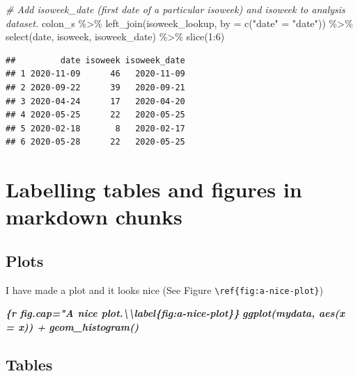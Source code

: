 \documentclass[
]{book}
\newenvironment{Shaded}{\begin{snugshade}}{\end{snugshade}}
\newcommand{\AttributeTok}[1]{\textcolor[rgb]{0.77,0.63,0.00}{#1}}
\newcommand{\CommentTok}[1]{\textcolor[rgb]{0.56,0.35,0.01}{\textit{#1}}}
\newcommand{\DecValTok}[1]{\textcolor[rgb]{0.00,0.00,0.81}{#1}}
\newcommand{\FunctionTok}[1]{\textcolor[rgb]{0.00,0.00,0.00}{#1}}
\newcommand{\InformationTok}[1]{\textcolor[rgb]{0.56,0.35,0.01}{\textbf{\textit{#1}}}}
\newcommand{\NormalTok}[1]{#1}
\newcommand{\OtherTok}[1]{\textcolor[rgb]{0.56,0.35,0.01}{#1}}
\newcommand{\SpecialCharTok}[1]{\textcolor[rgb]{0.00,0.00,0.00}{#1}}
\newcommand{\StringTok}[1]{\textcolor[rgb]{0.31,0.60,0.02}{#1}}
\begin{document}
\begin{Shaded}
\begin{Highlighting}[]
\CommentTok{\# Add isoweek\_date (first date of a particular isoweek) and isoweek to analysis dataset. }
\NormalTok{colon\_s }\SpecialCharTok{\%\textgreater{}\%} 
  \FunctionTok{left\_join}\NormalTok{(isoweek\_lookup, }\AttributeTok{by =} \FunctionTok{c}\NormalTok{(}\StringTok{"date"} \OtherTok{=} \StringTok{"date"}\NormalTok{)) }\SpecialCharTok{\%\textgreater{}\%} 
  \FunctionTok{select}\NormalTok{(date, isoweek, isoweek\_date) }\SpecialCharTok{\%\textgreater{}\%} 
  \FunctionTok{slice}\NormalTok{(}\DecValTok{1}\SpecialCharTok{:}\DecValTok{6}\NormalTok{)}
\end{Highlighting}
\end{Shaded}

\begin{verbatim}
##         date isoweek isoweek_date
## 1 2020-11-09      46   2020-11-09
## 2 2020-09-22      39   2020-09-21
## 3 2020-04-24      17   2020-04-20
## 4 2020-05-25      22   2020-05-25
## 5 2020-02-18       8   2020-02-17
## 6 2020-05-28      22   2020-05-25
\end{verbatim}

\hypertarget{labelling-tables-and-figures-in-markdown-chunks}{%
\section{Labelling tables and figures in markdown chunks}\label{labelling-tables-and-figures-in-markdown-chunks}}

\hypertarget{plots}{%
\subsection{Plots}\label{plots}}

I have made a plot and it looks nice (See Figure \texttt{\textbackslash{}ref\{fig:a-nice-plot\}})

\begin{Shaded}
\begin{Highlighting}[]
\InformationTok{\textasciigrave{}\textasciigrave{}\textasciigrave{}\{r fig.cap="A nice plot.\textbackslash{}\textbackslash{}label\{fig:a{-}nice{-}plot\}\}}
\InformationTok{ggplot(mydata, aes(x = x)) +}
\InformationTok{  geom\_histogram()}
\InformationTok{\textasciigrave{}\textasciigrave{}\textasciigrave{}}
\end{Highlighting}
\end{Shaded}

\hypertarget{tables}{%
\subsection{Tables}\label{tables}}
\end{document}
